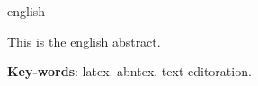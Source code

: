 \begin{resumo}[Abstract]

 \begin{otherlanguage*}{english}
 
   This is the english abstract.

   \vspace{\onelineskip}

   \noindent
   
   \textbf{Key-words}: latex. abntex. text editoration.
   
 \end{otherlanguage*}
 
\end{resumo}